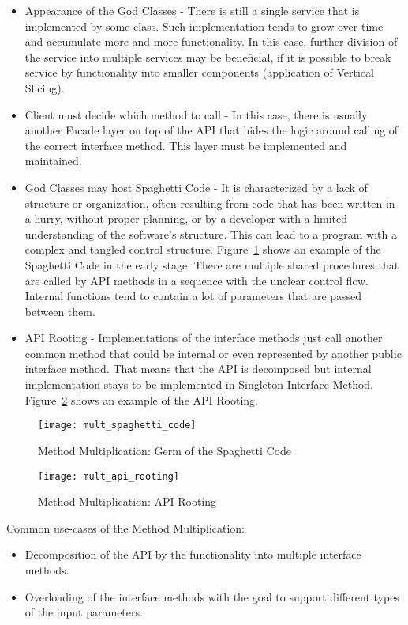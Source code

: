 \begin{itemize}
    \item Appearance of the God Classes - There is still a single service that is implemented by some class.
    Such implementation tends to grow over time and accumulate more and more functionality.
    In this case, further division of the service into multiple services may be beneficial, if it is possible
    to break service by functionality into smaller components (application of Vertical Slicing).
    \item Client must decide which method to call - In this case, there is usually another Facade layer on top
    of the API that hides the logic around calling of the correct interface method.
    This layer must be implemented and maintained.
    \item God Classes may host Spaghetti Code - It is characterized by a lack of structure or organization,
    often resulting from code that has been written in a hurry, without proper planning, or by a developer
    with a limited understanding of the software's structure.
    This can lead to a program with a complex and tangled control structure.
    Figure~\ref{fig:mult_spaghetti_code} shows an example of the Spaghetti Code in the early stage.
    There are multiple shared procedures that are called by API methods in a sequence with the unclear control flow.
    Internal functions tend to contain a lot of parameters that are passed between them.
    \item API Rooting - Implementations of the interface methods just call another common method that could be internal
    or even represented by another public interface method.
    That means that the API is decomposed but internal implementation stays to be implemented
    in Singleton Interface Method.
    Figure~\ref{fig:mult_api_rooting} shows an example of the API Rooting.
\end{itemize}

\begin{figure}[!htb]
    \centering
    \texttt{[image: mult\_spaghetti\_code]}
    \caption{Method Multiplication: Germ of the Spaghetti Code}
    \label{fig:mult_spaghetti_code}
\end{figure}

\begin{figure}[!htb]
    \centering
    \texttt{[image: mult\_api\_rooting]}
    \caption{Method Multiplication: API Rooting}
    \label{fig:mult_api_rooting}
\end{figure}

Common use-cases of the Method Multiplication:

\begin{itemize}
    \item Decomposition of the API by the functionality into multiple interface methods.
    \item Overloading of the interface methods with the goal to support different types of the input parameters.
\end{itemize}

